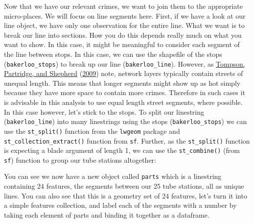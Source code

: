 \documentclass[
  krantz2]{krantz}
\makeatletter
\newenvironment{Shaded}{\begin{snugshade}}{\end{snugshade}}
\newcommand{\FunctionTok}[1]{\textcolor[rgb]{0,0,0}{#1}}
\newcommand{\NormalTok}[1]{#1}
\newcommand{\OtherTok}[1]{\textcolor[rgb]{0.37,0.37,0.37}{#1}}
\newcommand{\SpecialCharTok}[1]{\textcolor[rgb]{0,0,0}{#1}}
\newcommand{\StringTok}[1]{\textcolor[rgb]{0.5,0.5,0.5}{#1}}
\newenvironment{kframe}{%
\medskip{}
\setlength{\fboxsep}{.8em}
 \def\at@end@of@kframe{}%
 \ifinner\ifhmode%
  \def\at@end@of@kframe{\end{minipage}}%
  \begin{minipage}{\columnwidth}%
 \fi\fi%
 \def\FrameCommand##1{\hskip\@totalleftmargin \hskip-\fboxsep
 \colorbox{shadecolor}{##1}\hskip-\fboxsep
     \hskip-\linewidth \hskip-\@totalleftmargin \hskip\columnwidth}%
 \MakeFramed {\advance\hsize-\width
   \@totalleftmargin\z@ \linewidth\hsize
   \@setminipage}}%
 {\par\unskip\endMakeFramed%
 \at@end@of@kframe}
\renewenvironment{Shaded}{\begin{kframe}}{\end{kframe}}
\makeatother
\begin{document}
Now that we have our relevant crimes, we want to join them to the appropriate micro-places. We will focus on line segments here. First, if we have a look at our line object, we have only one observation for the entire line. What we want is to break our line into sections. How you do this depends really much on what you want to show. In this case, it might be meaningful to consider each segment of the line between stops. In this case, we can use the shapefile of the stops (\texttt{bakerloo\_stops}) to break up our line (\texttt{bakerloo\_line}). However, as \protect\hyperlink{ref-Tompson_2009}{Tompson, Partridge, and Shepherd} (\protect\hyperlink{ref-Tompson_2009}{2009}) note, network layers typically contain streets of unequal length. This means that longer segments might show up as hot simply because they have more space to contain more crimes. Therefore in such cases it is advisable in this analysis to use equal length street segments, where possible. In this case however, let's stick to the stops. To split our linestring (\texttt{bakerloo\_line}) into many linestrings using the stops (\texttt{bakerloo\_stops}) we can use the \texttt{st\_split()} function from the \texttt{lwgeom} package and \texttt{st\_collection\_extract()} function from \texttt{sf}. Further, as the \texttt{st\_split()} function is expecting a blade argument of length 1, we can use the \texttt{st\_combine()} (from \texttt{sf}) function to group our tube stations altogether:

\begin{Shaded}
\end{Shaded}

You can see we now have a new object called \texttt{parts} which is a linestring containing 24 features, the segments between our 25 tube stations, all as unique lines. You can also see that this is a geometry set of 24 features, let's turn it into a simple features collection, and label each of the segments with a number by taking each element of parts and binding it together as a dataframe.
\end{document}
